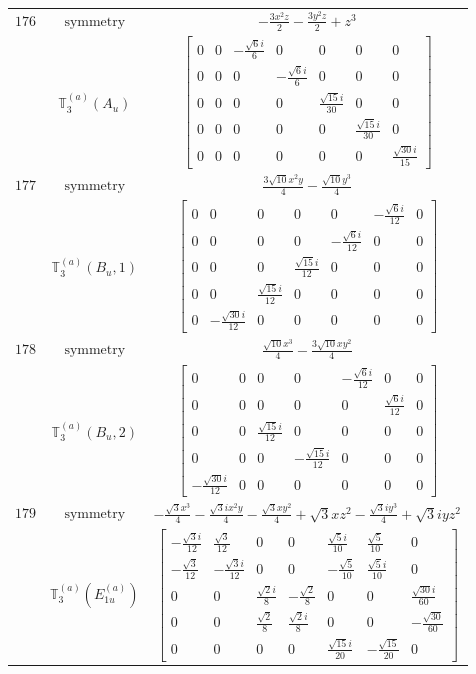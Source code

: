 \documentclass[fleqn,8pt,landscape]{jsarticle}
\begin{document}
\begin{longtable}{ccc}
$ 176 $ & $ \text{symmetry} $ & $ - \frac{3 x^{2} z}{2} - \frac{3 y^{2} z}{2} + z^{3} $ \\
$  $ & $ \mathbb{T}_{3}^{(a)}(A_{u}) $ & $ \begin{bmatrix} 0 & 0 & - \frac{\sqrt{6} i}{6} & 0 & 0 & 0 & 0 \\ 0 & 0 & 0 & - \frac{\sqrt{6} i}{6} & 0 & 0 & 0 \\ 0 & 0 & 0 & 0 & \frac{\sqrt{15} i}{30} & 0 & 0 \\ 0 & 0 & 0 & 0 & 0 & \frac{\sqrt{15} i}{30} & 0 \\ 0 & 0 & 0 & 0 & 0 & 0 & \frac{\sqrt{30} i}{15} \end{bmatrix} $ \\ \hline
$ 177 $ & $ \text{symmetry} $ & $ \frac{3 \sqrt{10} x^{2} y}{4} - \frac{\sqrt{10} y^{3}}{4} $ \\
$  $ & $ \mathbb{T}_{3}^{(a)}(B_{u},1) $ & $ \begin{bmatrix} 0 & 0 & 0 & 0 & 0 & - \frac{\sqrt{6} i}{12} & 0 \\ 0 & 0 & 0 & 0 & - \frac{\sqrt{6} i}{12} & 0 & 0 \\ 0 & 0 & 0 & \frac{\sqrt{15} i}{12} & 0 & 0 & 0 \\ 0 & 0 & \frac{\sqrt{15} i}{12} & 0 & 0 & 0 & 0 \\ 0 & - \frac{\sqrt{30} i}{12} & 0 & 0 & 0 & 0 & 0 \end{bmatrix} $ \\ \hline
$ 178 $ & $ \text{symmetry} $ & $ \frac{\sqrt{10} x^{3}}{4} - \frac{3 \sqrt{10} x y^{2}}{4} $ \\
$  $ & $ \mathbb{T}_{3}^{(a)}(B_{u},2) $ & $ \begin{bmatrix} 0 & 0 & 0 & 0 & - \frac{\sqrt{6} i}{12} & 0 & 0 \\ 0 & 0 & 0 & 0 & 0 & \frac{\sqrt{6} i}{12} & 0 \\ 0 & 0 & \frac{\sqrt{15} i}{12} & 0 & 0 & 0 & 0 \\ 0 & 0 & 0 & - \frac{\sqrt{15} i}{12} & 0 & 0 & 0 \\ - \frac{\sqrt{30} i}{12} & 0 & 0 & 0 & 0 & 0 & 0 \end{bmatrix} $ \\ \hline
$ 179 $ & $ \text{symmetry} $ & $ - \frac{\sqrt{3} x^{3}}{4} - \frac{\sqrt{3} i x^{2} y}{4} - \frac{\sqrt{3} x y^{2}}{4} + \sqrt{3} x z^{2} - \frac{\sqrt{3} i y^{3}}{4} + \sqrt{3} i y z^{2} $ \\
$  $ & $ \mathbb{T}_{3}^{(a)}(E_{1u}^{(a)}) $ & $ \begin{bmatrix} - \frac{\sqrt{3} i}{12} & \frac{\sqrt{3}}{12} & 0 & 0 & \frac{\sqrt{5} i}{10} & \frac{\sqrt{5}}{10} & 0 \\ - \frac{\sqrt{3}}{12} & - \frac{\sqrt{3} i}{12} & 0 & 0 & - \frac{\sqrt{5}}{10} & \frac{\sqrt{5} i}{10} & 0 \\ 0 & 0 & \frac{\sqrt{2} i}{8} & - \frac{\sqrt{2}}{8} & 0 & 0 & \frac{\sqrt{30} i}{60} \\ 0 & 0 & \frac{\sqrt{2}}{8} & \frac{\sqrt{2} i}{8} & 0 & 0 & - \frac{\sqrt{30}}{60} \\ 0 & 0 & 0 & 0 & \frac{\sqrt{15} i}{20} & - \frac{\sqrt{15}}{20} & 0 \end{bmatrix} $ \\ \hline

\end{longtable}
\end{document}
